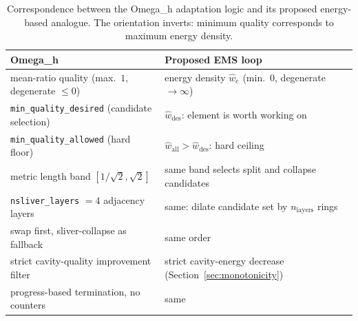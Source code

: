 \documentclass[11pt]{article}
\newcommand{\code}[1]{\texttt{#1}}
\newcommand{\omegah}{Omega\_h}
\begin{document}
\begin{table}[ht]
\centering
\begin{tabular}{ll}
\toprule
\omegah{} & Proposed EMS loop \\
\midrule
mean-ratio quality (max.\ $1$, degenerate $\leq 0$) &
  energy density $\hat{w}_e$ (min.\ $0$, degenerate $\to\infty$) \\
\code{min\_quality\_desired} (candidate selection) &
  $\hat{w}_{\text{des}}$: element is worth working on \\
\code{min\_quality\_allowed} (hard floor) &
  $\hat{w}_{\text{all}} > \hat{w}_{\text{des}}$: hard ceiling \\
metric length band $[1/\sqrt{2}, \sqrt{2}]$ &
  same band selects split and collapse candidates \\
\code{nsliver\_layers} $= 4$ adjacency layers &
  same: dilate candidate set by $n_{\text{layers}}$ rings \\
swap first, sliver-collapse as fallback & same order \\
strict cavity-quality improvement filter &
  strict cavity-energy decrease (Section~\ref{sec:monotonicity}) \\
progress-based termination, no counters & same \\
\bottomrule
\end{tabular}
\caption{Correspondence between the \omegah{} adaptation logic and its
proposed energy-based analogue. The orientation inverts: minimum
quality corresponds to maximum energy density.}
\label{tab:translation}
\end{table}
\end{document}
